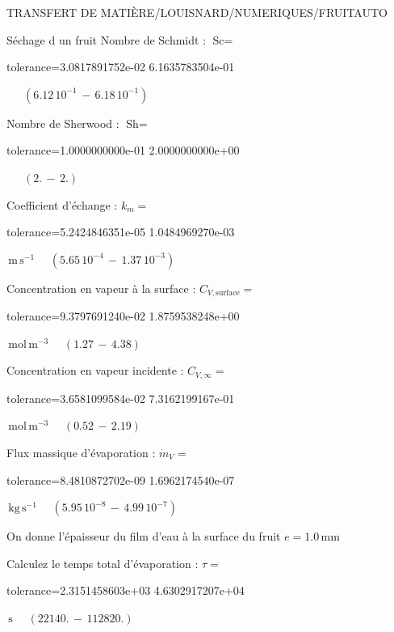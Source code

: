 \documentclass[12pt]{article}
\begin{document}
\begin{quiz}{TRANSFERT DE MATIÈRE/LOUISNARD/NUMERIQUES/FRUITAUTO}
\begin{cloze}{Séchage d un fruit}
Nombre de Schmidt : $\text{Sc} =  $
\begin{numerical}[points=1] 
\item[tolerance={3.0817891752e-02}] 6.1635783504e-01 
\end{numerical} 
 $\,$ 
 $ \quad ( 6.12 \, 10^{-1}  \, - \,  6.18 \, 10^{-1} ) $ 

Nombre de Sherwood : $\text{Sh} =  $
\begin{numerical}[points=2] 
\item[tolerance={1.0000000000e-01}] 2.0000000000e+00 
\end{numerical} 
 $\,$ 
 $ \quad (2. \, - \, 2.) $ 

Coefficient d'échange : $k_m =  $
\begin{numerical}[points=1] 
\item[tolerance={5.2424846351e-05}] 1.0484969270e-03 
\end{numerical} 
 $\,  \mathrm{m}\,  \mathrm{s}^{-1}$ 
 $ \quad ( 5.65 \, 10^{-4}  \, - \,  1.37 \, 10^{-3} ) $ 

Concentration en vapeur à la surface : $C_{V, \text{surface}} =  $
\begin{numerical}[points=2] 
\item[tolerance={9.3797691240e-02}] 1.8759538248e+00 
\end{numerical} 
 $\,  \mathrm{mol}\,  \mathrm{m}^{-3}$ 
 $ \quad (1.27 \, - \, 4.38) $ 

Concentration en vapeur incidente : $C_{V, \infty} =  $
\begin{numerical}[points=2] 
\item[tolerance={3.6581099584e-02}] 7.3162199167e-01 
\end{numerical} 
 $\,  \mathrm{mol}\,  \mathrm{m}^{-3}$ 
 $ \quad (0.52 \, - \, 2.19) $ 

Flux massique d'évaporation : $\dot{m}_V =  $
\begin{numerical}[points=1] 
\item[tolerance={8.4810872702e-09}] 1.6962174540e-07 
\end{numerical} 
 $\,  \mathrm{kg}\,  \mathrm{s}^{-1}$ 
 $ \quad ( 5.95 \, 10^{-8}  \, - \,  4.99 \, 10^{-7} ) $ 

 

On donne l'épaisseur du film d'eau à la surface du fruit $e = 1.0\,  \mathrm{mm} $

Calculez le temps total d'évaporation : $\tau =  $
\begin{numerical}[points=2] 
\item[tolerance={2.3151458603e+03}] 4.6302917207e+04 
\end{numerical} 
 $\,  \mathrm{s}$ 
 $ \quad (22140. \, - \, 112820.) $ 


\end{cloze}
\end{quiz}
\end{document}
